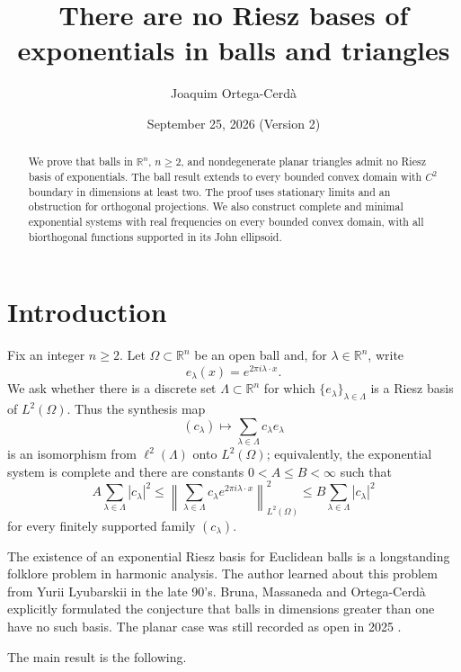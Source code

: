 \documentclass[a4paper,12pt,reqno]{amsart}
\title[No Riesz bases of exponentials]{There are no Riesz bases of exponentials in balls and triangles}
\author{Joaquim Ortega-Cerdà}
\date{September 25, 2026 (Version 2)}
\theoremstyle{remark}
\numberwithin{equation}{section}
\newcommand{\R}{\mathbb R}
\begin{document}
\raggedbottom

\begin{abstract}
We prove that balls in $\R^n$, $n\geq2$, and nondegenerate planar
triangles admit no Riesz basis of exponentials. The ball result extends
to every bounded convex domain with $C^2$ boundary in dimensions at least
two. The proof uses stationary limits and an obstruction for orthogonal
projections. We also construct complete and minimal exponential systems
with real frequencies on every bounded convex domain, with all
biorthogonal functions supported in its John ellipsoid.
\end{abstract}

\maketitle


\section{Introduction}


Fix an integer $n\geq2$.  Let $\Omega\subset\R^n$ be an open ball and, for $\lambda\in\R^n$, write
\[
 e_\lambda(x)=e^{2\pi i\lambda\cdot x}.
\]
We ask whether there is a discrete set $\Lambda\subset\R^n$ for which
$\{e_\lambda\}_{\lambda\in\Lambda}$ is a Riesz basis of $L^2(\Omega)$.  Thus the
synthesis map
\[
 (c_\lambda)\longmapsto \sum_{\lambda\in\Lambda}c_\lambda e_\lambda
\]
is an isomorphism from $\ell^2(\Lambda)$ onto $L^2(\Omega)$; equivalently, the exponential system is complete and there
are constants $0<A\leq B<\infty$ such that
\begin{equation}\label{eq:riesz}
 A\sum_{\lambda\in\Lambda}|c_\lambda|^2
 \leq
 \left\|\sum_{\lambda\in\Lambda}c_\lambda e^{2\pi i\lambda\cdot x}\right\|_{L^2(\Omega)}^2
 \leq
 B\sum_{\lambda\in\Lambda}|c_\lambda|^2
\end{equation}
for every finitely supported family $(c_\lambda)$.

The existence of an exponential Riesz basis for Euclidean balls is a longstanding
folklore problem in harmonic analysis. The author learned about this problem from Yurii Lyubarskii in the late 90's.  Bruna, Massaneda and Ortega-Cerdà
\cite[Section~5, p.~350]{BrunaMassanedaOrtegaCerda} explicitly formulated
the conjecture that balls in dimensions greater than one have no such basis.
The planar case was still recorded as open in 2025
\cite[Section~1.2]{LevTselishchev}.

The main result is the following.
\end{document}
